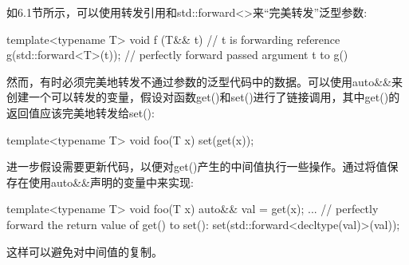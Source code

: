 如6.1节所示，可以使用转发引用和std::forward<>来“完美转发”泛型参数:

\begin{cpp}
template<typename T>
void f (T&& t) // t is forwarding reference
{
	g(std::forward<T>(t)); // perfectly forward passed argument t to g()
}
\end{cpp}

然而，有时必须完美地转发不通过参数的泛型代码中的数据。可以使用auto\&\&来创建一个可以转发的变量，假设对函数get()和set()进行了链接调用，其中get()的返回值应该完美地转发给set():

\begin{cpp}
template<typename T>
void foo(T x)
{
	set(get(x));
}
\end{cpp}

进一步假设需要更新代码，以便对get()产生的中间值执行一些操作。通过将值保存在使用auto\&\&声明的变量中来实现:

\begin{cpp}
template<typename T>
void foo(T x)
{
	auto&& val = get(x);
	...
	// perfectly forward the return value of get() to set():
	set(std::forward<decltype(val)>(val));
}
\end{cpp}

这样可以避免对中间值的复制。








































